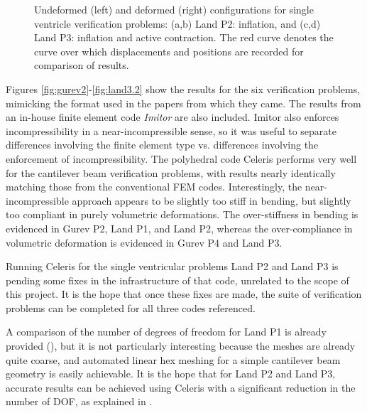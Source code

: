 \begin{figure}[ht]
{\label{fig:ventricles3}}		
%
\caption{Undeformed (left) and deformed (right) configurations for single ventricle verification problems: (a,b) Land P2: inflation, and (c,d) Land P3: inflation and active contraction. The red curve denotes the curve over which displacements and positions are recorded for comparison of results.}
\label{fig:ventricles}
\end{figure}

Figures \ref*{fig:gurev2}-\ref*{fig:land3.2} show the results for the six verification problems, mimicking the format used in the papers from which they came. The results from an in-house finite element code \textit{Imitor} are also included. Imitor also enforces incompressibility in a near-incompressible sense, so it was useful to separate differences involving the finite element type vs. differences involving the enforcement of incompressibility.  The polyhedral code Celeris performs very well for the cantilever beam verification problems, with results nearly identically matching those from the conventional FEM codes. Interestingly, the near-incompressible approach appears to be slightly too stiff in bending, but slightly too compliant in purely volumetric deformations. The over-stiffness in bending is evidenced in Gurev P2, Land P1, and Land P2, whereas the over-compliance in volumetric deformation is evidenced in Gurev P4 and Land P3.

Running Celeris for the single ventricular problems Land P2 and Land P3 is pending some fixes in the infrastructure of that code, unrelated to the scope of this project. It is the hope that once these fixes are made, the suite of verification problems can be completed for all three codes referenced.

A comparison of the number of degrees of freedom for Land P1 is already provided (), but it is not particularly interesting because the meshes are already quite coarse, and automated linear hex meshing for a simple cantilever beam geometry is easily achievable. It is the hope that for Land P2 and Land P3, accurate results can be achieved using Celeris with a significant reduction in the number of DOF, as explained in .

